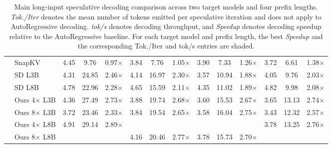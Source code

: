 \begin{table}[t!]
{\begin{tabular}{@{}l|l|ccc|ccc|ccc|ccc@{}}
        & SnapKV                & 4.45 & 9.76  & 0.97$\times$ & 3.84 & 7.76 & 1.05$\times$ & 3.90 & 7.33 & 1.26$\times$ & 3.72 & 6.61 & 1.38$\times$ \\
        & SD L3B                & 4.31 & 24.85 & 2.46$\times$ & 4.14 & 16.97 & 2.30$\times$ & 3.57 & 10.94 & 1.88$\times$ & 4.05 & 9.76 & 2.03$\times$ \\
        & SD L8B                & 4.78 & 22.96 & 2.28$\times$ & 4.65 & 15.59 & 2.11$\times$ & 4.35 & 11.02 & 1.89$\times$ & 4.82 & 9.98  & 2.08$\times$ \\
        \rowcolor[gray]{0.9}\cellcolor{white}      
        & Ours 4$\times$ L3B    & 4.36 & 27.49 & 2.73$\times$ & 3.88 & 19.74 & 2.68$\times$ & 3.60 & 15.53 & 2.67$\times$ & 3.65 & 13.13 & 2.74$\times$ \\
        \rowcolor[gray]{0.9}\cellcolor{white}    
        & Ours 8$\times$ L3B    & 3.72 & 23.46 & 2.33$\times$ & 3.84 & 19.54 & 2.65$\times$ & 3.58 & 16.04 & 2.75$\times$ & 3.43 & 12.32 & 2.57$\times$ \\
        \rowcolor[gray]{0.9}\cellcolor{white}      
        & Ours 4$\times$ L8B    & 4.91 & 29.14 & 2.89$\times$ & \cellcolor{bestspeed}{4.99} & \cellcolor{bestspeed}{24.54} & \cellcolor{bestspeed}{3.33$\times$} & \cellcolor{bestspeed}{4.07} & \cellcolor{bestspeed}{16.93} & \cellcolor{bestspeed}{2.91$\times$} & {3.78} & {13.25} & {2.76$\times$} \\
        \rowcolor[gray]{0.9}\cellcolor{white}    
        \multirow{-11}{*}{\rotatebox{90}{L3.1-70B}}
        & Ours 8$\times$ L8B    & \cellcolor{bestspeed}{5.15} & \cellcolor{bestspeed}{30.54} & \cellcolor{bestspeed}{3.03$\times$} & 4.16 & 20.46 & 2.77$\times$ & 3.78 & 15.73 & 2.70$\times$ & \cellcolor{bestspeed}{3.77} & \cellcolor{bestspeed}{13.54} & \cellcolor{bestspeed}{2.82$\times$} \\
        \bottomrule
    \end{tabular}%
    }
    \caption{Main long-input speculative decoding comparison across two target models and four prefix lengths. \textit{Tok./Iter} denotes the mean number of tokens emitted per speculative iteration and does not apply to AutoRegressive decoding. \textit{tok/s} denotes decoding throughput, and \textit{Speedup} denotes decoding speedup relative to the AutoRegressive baseline. For each target model and prefix length, the best \textit{Speedup} and the corresponding Tok./Iter and tok/s entries are shaded.
    }
    \label{tab:main_results_long_input}
\end{table}

